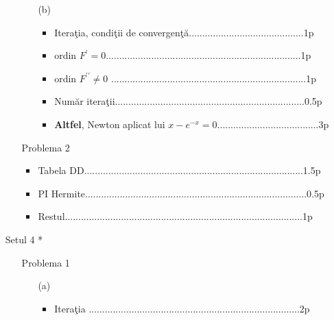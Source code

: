 \documentclass{article}%
\begin{document}
\begin{enumerate}
\begin{enumerate}
\begin{enumerate}
\item[(b)] 

\begin{itemize}
\item Itera\c{t}ia, condi\c{t}ii de convergen\c{t}\u{a}...........................................1p

\item ordin $F^{\prime}=0$.........................................................................1p

\item ordin $F^{\prime\prime}\neq0$%
.........................................................................1p\newline%


\item Num\u{a}r itera\c{t}ii.......................................................................0.5p

\item \textbf{Altfel}, Newton aplicat lui $x-e^{-x}=0$......................................3p
\end{itemize}
\end{enumerate}

\item[Problema 2] 

\begin{itemize}
\item Tabela DD..................................................................................1.5p

\item PI Hermite...................................................................................0.5p

\item Restul.........................................................................................1p
\end{itemize}
\end{enumerate}

\item[Setul 4] *

\begin{enumerate}
\item[Problema 1] 

\begin{enumerate}
\item[(a)] 

\begin{itemize}
\item Itera\c{t}ia ...............................................................................2p


\end{itemize}
\end{enumerate}
\end{enumerate}
\end{enumerate}
\end{document}
